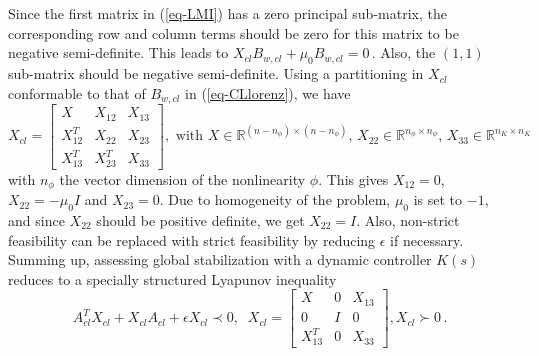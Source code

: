 \documentclass[12pt, a4paper,reqno]{amsart}
\theoremstyle{definition}
\begin{document}
\section{}\label{appendix-C}
Since the first matrix in (\ref{eq-LMI}) has a zero principal sub-matrix, 
the corresponding row and column terms should be zero for this
matrix to be negative semi-definite. This leads to $ X_{cl} B_{w,cl} + \mu_0  B_{w,cl} = 0 \,
$. Also, the $(1,1)$ sub-matrix should be negative semi-definite.   Using a partitioning in $X_{cl}$ conformable to that of $B_{w,cl}$ in (\ref{eq-CLlorenz}), we have 
$$X_{cl} = \begin{bmatrix}X & X_{12} & X_{13} \\ X_{12}^T & X_{22} & X_{23} \\ X_{13}^T & X_{23}^T & X_{33} \end{bmatrix}, \mbox{ with } X \in \mathbb R^{(n-n_\phi)\times (n-n_\phi)} ,\, X_{22} \in \mathbb R^{n_\phi\times n_\phi},\, X_{33} \in \mathbb R^{n_K\times n_K}  $$
with $n_\phi$ the vector dimension of the nonlinearity $\phi$.
This gives $X_{12}= 0$, $X_{22}=  -\mu_0 I$ and $X_{23}=0$. Due to homogeneity of the problem, 
$\mu_0$ is set to $-1$, and since $X_{22}$ should be positive definite, we get $X_{22} = I$. 
Also, non-strict feasibility can be replaced with strict feasibility by reducing $\epsilon$ if necessary. 
Summing up, assessing global stabilization with a dynamic controller $K(s)$ reduces to a specially structured Lyapunov inequality
\begin{equation}
\label{eq-BMI}
A_{cl}^T X_{cl} + X_{cl}  A_{cl} + \epsilon X_{cl} \prec 0, \;  \;X_{cl} = \begin{bmatrix}X & 0 & X_{13} \\ 0 &  I & 0 \\ X_{13}^T & 0 & X_{33} \end{bmatrix}, X_{cl} \succ 0 \,. 
\end{equation}
\end{document}
